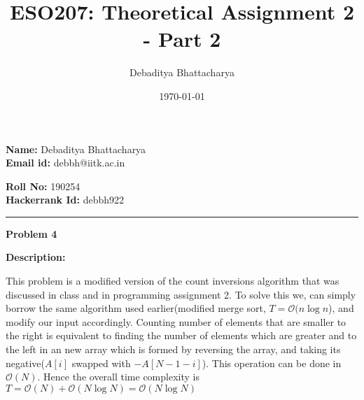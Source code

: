 \documentclass[10pt, a4paper]{article}
\title{ESO207: Theoretical Assignment 2 - Part 2}
\author{Debaditya Bhattacharya}
\date{\today}
\newcommand{\BigO}{\mathcal{O}}
\begin{document}
\maketitle

\noindent\begin{minipage}{2in}
    \textbf{Name: }Debaditya Bhattacharya \\
    \textbf{Email id: }debbh@iitk.ac.in  
\end{minipage}
\hfill
\noindent\begin{minipage}{1.7in}
    \textbf{Roll No: }190254\\
    \textbf{Hackerrank Id: }debbh922
\end{minipage}
\parskip 0.3cm
\parindent 0cm
\rule{\textwidth}{1px}


\large{\textbf{Problem 4}}
\normalsize

\textbf{Description:}

This problem is a modified version of the count inversions algorithm that was discussed in class and in programming assignment 2. To solve this we, can simply borrow the same algorithm used earlier(modified merge sort, $T = \BigO(n\log n$), and modify our input accordingly. Counting number of elements that are smaller to the right is equivalent to finding the number of elements which are greater and to the left in an new array which is formed by reversing the array, and taking its negative($A[i]$ swapped with $-A[N-1-i]$). This operation can be done in $\BigO(N)$. Hence the overall time complexity is $T = \BigO(N) + \BigO(N\log N) = \BigO(N\log N)$
\end{document}
